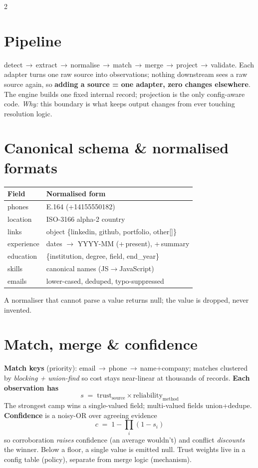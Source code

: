 \documentclass[10pt]{article}
\newcommand{\fld}[1]{{\ttfamily\footnotesize #1}}
\begin{document}
\begin{multicols}{2}
\footnotesize

\section{Pipeline}
\fld{detect\,$\to$\,extract\,$\to$\,normalise\,$\to$\,match\,$\to$\,merge\,$\to$\,project\,$\to$\,validate.}
Each adapter turns one raw source into observations; nothing downstream sees a
raw source again, so \textbf{adding a source = one adapter, zero changes
elsewhere}. The engine builds one fixed internal record; projection is the only
config-aware code. \emph{Why:} this boundary is what keeps output changes from
ever touching resolution logic.

\section{Canonical schema \& normalised formats}
\vspace{-2pt}
{\renewcommand{\arraystretch}{1.05}\setlength{\tabcolsep}{3pt}
\begin{tabular}{@{}p{2.05cm}p{4.0cm}@{}}
\toprule
\textbf{Field} & \textbf{Normalised form} \\
\midrule
phones & E.164 (\fld{+14155550182}) \\
location & ISO-3166 alpha-2 country \\
links & object \fld{\{linkedin, github, portfolio, other[]\}} \\
experience & dates $\to$ \fld{YYYY-MM} (+\,\fld{present}), +\,summary \\
education & \fld{\{institution, degree, field, end\_year\}} \\
skills & canonical names (\fld{JS}$\to$JavaScript) \\
emails & lower-cased, deduped, typo-suppressed \\
\bottomrule
\end{tabular}}

A normaliser that cannot parse a value returns \fld{null}; the value is dropped,
never invented.

\section{Match, merge \& confidence}
\textbf{Match keys} (priority): email\,$\to$\,phone\,$\to$\,name+company; matches
clustered by \emph{blocking + union-find} so cost stays near-linear at thousands
of records. \textbf{Each observation has}
\[ s \;=\; \text{trust}_{\text{source}} \times \text{reliability}_{\text{method}} \]
The strongest camp wins a single-valued field; multi-valued fields union+dedupe.
\textbf{Confidence} is a noisy-OR over agreeing evidence
\[ c \;=\; 1 - \textstyle\prod_i (1 - s_i) \]
so corroboration \emph{raises} confidence (an average wouldn't) and conflict
\emph{discounts} the winner. Below a floor, a single value is emitted \fld{null}.
Trust weights live in a config table (policy), separate from merge logic
(mechanism).


\end{multicols}
\end{document}
